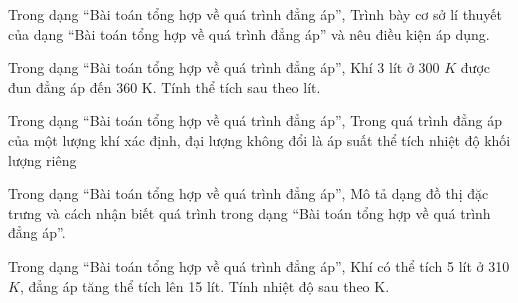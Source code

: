 \begin{ex}
Trong dạng “Bài toán tổng hợp về quá trình đẳng áp”, Trình bày cơ sở lí thuyết của dạng “Bài toán tổng hợp về quá trình đẳng áp” và nêu điều kiện áp dụng.
\choiceTF

\end{ex}

\begin{ex}
Trong dạng “Bài toán tổng hợp về quá trình đẳng áp”, Khí 3 lít ở 300 $K$ được đun đẳng áp đến 360 K. Tính thể tích sau theo lít.
\end{ex}

\begin{ex}
Trong dạng “Bài toán tổng hợp về quá trình đẳng áp”, Trong quá trình đẳng áp của một lượng khí xác định, đại lượng không đổi là
\choice
{\True áp suất}
{thể tích}
{nhiệt độ}
{khối lượng riêng}
\end{ex}


\begin{ex}
Trong dạng “Bài toán tổng hợp về quá trình đẳng áp”, Mô tả dạng đồ thị đặc trưng và cách nhận biết quá trình trong dạng “Bài toán tổng hợp về quá trình đẳng áp”.
\choiceTF

\end{ex}

\begin{ex}
Trong dạng “Bài toán tổng hợp về quá trình đẳng áp”, Khí có thể tích 5 lít ở 310 $K$, đẳng áp tăng thể tích lên 15 lít. Tính nhiệt độ sau theo K.
\end{ex}

